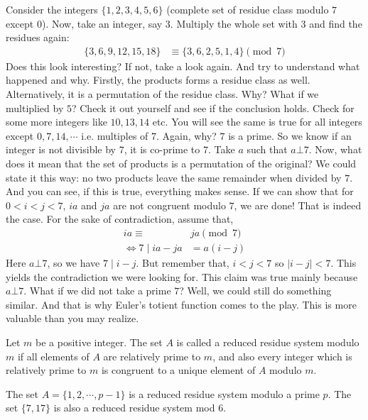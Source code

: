 \documentclass{subfile}
\begin{document}
	Consider the integers $\{1,2,3,4,5,6\}$ (complete set of residue class modulo $7$ except $0$). Now, take an integer, say $3$. Multiply the whole set with $3$ and find the residues again:
		\begin{align*}
			\{3,6,9,12,15,18\} & \equiv\{3,6,2,5,1,4\}\pmod7
		\end{align*}
	Does this look interesting? If not, take a look again. And try to understand what happened and why. Firstly, the products forms a residue class as well. Alternatively, it is a permutation of the residue class. Why? What if we multiplied by $5$? Check it out yourself and see if the conclusion holds. Check for some more integers like $10, 13,14$ etc. You will see the same is true for all integers except $0,7,14,\cdots$ i.e. multiples of $7$. Again, why? $7$ is a prime. So we know if an integer is not divisible by $7$, it is co-prime to $7$. Take $a$ such that $a\bot7$. Now, what does it mean that the set of products is a permutation of the original? We could state it this way: no two products leave the same remainder when divided by $7$. And you can see, if this is true, everything makes sense. If we can show that for $0<i<j<7$, $ia$ and $ja$ are not congruent modulo $7$, we are done! That is indeed the case. For the sake of contradiction, assume that,
		\begin{align*}
			ia  \equiv &ja\pmod7\\
			\iff 7\mid ia-ja&=a(i-j)
		\end{align*}
	Here $a\bot7$, so we have $7\mid i-j$. But remember that, $i<j<7$ so $|i-j|<7$. This yields the contradiction we were looking for. This claim was true mainly because $a\bot7$. What if we did not take a prime $7$? Well, we could still do something similar. And that is why Euler's totient function comes to the play. This is more valuable than you may realize.

	\begin{definition}
		Let $m$ be a positive integer. The set $A$ is called a {reduced residue system modulo $m$} if all elements of $A$ are relatively prime to $m$, and also every integer which is relatively prime to $m$ is congruent to a unique element of $A$ modulo $m$.
	\end{definition}

	\begin{example}
		The set $A=\{ 1, 2, \cdots, p-1 \}$ is a reduced residue system modulo a prime $p$. The set $\{7, 17\}$ is also a reduced residue system mod $6$.
	\end{example}
\end{document}
